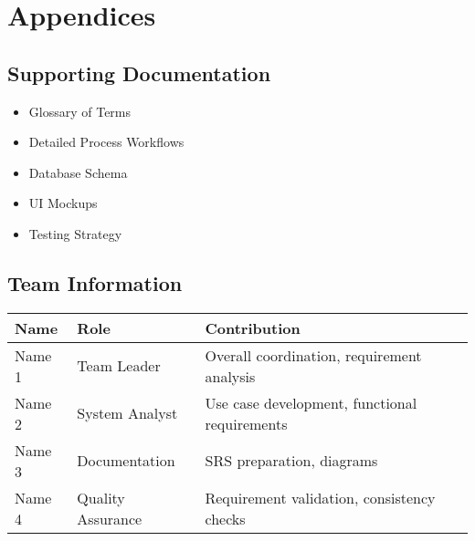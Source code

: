 \documentclass[12pt,a4paper]{report}
\begin{document}
\chapter{Appendices}

\section{Supporting Documentation}
\begin{itemize}
    \item Glossary of Terms
    \item Detailed Process Workflows
    \item Database Schema
    \item UI Mockups
    \item Testing Strategy
\end{itemize}

\section{Team Information}
\begin{tabularx}{\textwidth}{|l|X|X|}
    \hline
    \textbf{Name} & \textbf{Role} & \textbf{Contribution} \\
    \hline
    Name 1 & Team Leader & Overall coordination, requirement analysis \\
    \hline
    Name 2 & System Analyst & Use case development, functional requirements \\
    \hline
    Name 3 & Documentation & SRS preparation, diagrams \\
    \hline
    Name 4 & Quality Assurance & Requirement validation, consistency checks \\
    \hline
\end{tabularx}
\end{document}
